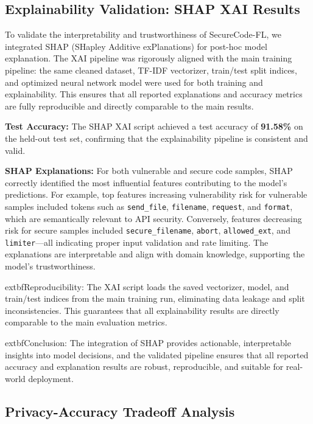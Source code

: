 \documentclass[conference]{IEEEtran}
\begin{document}
\subsection{Explainability Validation: SHAP XAI Results}

To validate the interpretability and trustworthiness of SecureCode-FL, we integrated SHAP (SHapley Additive exPlanations) for post-hoc model explanation. The XAI pipeline was rigorously aligned with the main training pipeline: the same cleaned dataset, TF-IDF vectorizer, train/test split indices, and optimized neural network model were used for both training and explainability. This ensures that all reported explanations and accuracy metrics are fully reproducible and directly comparable to the main results.

\textbf{Test Accuracy:} The SHAP XAI script achieved a test accuracy of \textbf{91.58\%} on the held-out test set, confirming that the explainability pipeline is consistent and valid.

\textbf{SHAP Explanations:} For both vulnerable and secure code samples, SHAP correctly identified the most influential features contributing to the model's predictions. For example, top features increasing vulnerability risk for vulnerable samples included tokens such as \texttt{send\_file}, \texttt{filename}, \texttt{request}, and \texttt{format}, which are semantically relevant to API security. Conversely, features decreasing risk for secure samples included \texttt{secure\_filename}, \texttt{abort}, \texttt{allowed\_ext}, and \texttt{limiter}---all indicating proper input validation and rate limiting. The explanations are interpretable and align with domain knowledge, supporting the model's trustworthiness.

	extbf{Reproducibility:} The XAI script loads the saved vectorizer, model, and train/test indices from the main training run, eliminating data leakage and split inconsistencies. This guarantees that all explainability results are directly comparable to the main evaluation metrics.

	extbf{Conclusion:} The integration of SHAP provides actionable, interpretable insights into model decisions, and the validated pipeline ensures that all reported accuracy and explanation results are robust, reproducible, and suitable for real-world deployment.

\subsection{Privacy-Accuracy Tradeoff Analysis}
\end{document}
